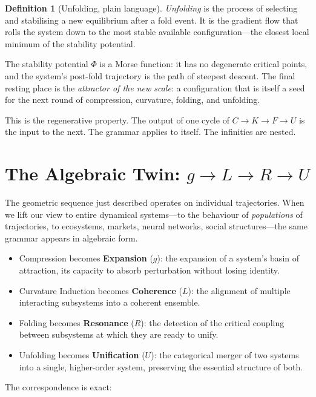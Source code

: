 \documentclass[12pt, oneside]{book}
\theoremstyle{plain}
\theoremstyle{definition}
\newtheorem{definition}{Definition}[chapter]
\theoremstyle{remark}
\begin{document}
\begin{definition}[Unfolding, plain language]
\emph{Unfolding} is the process of selecting and stabilising
a new equilibrium after a fold event. It is the gradient
flow that rolls the system down to the most stable available
configuration---the closest local minimum of the stability
potential.
\end{definition}

The stability potential $\Phi$ is a Morse function: it has
no degenerate critical points, and the system's post-fold
trajectory is the path of steepest descent. The final
resting place is the \emph{attractor of the new scale}:
a configuration that is itself a seed for the next round
of compression, curvature, folding, and unfolding.

This is the regenerative property. The output of one cycle
of $C \to K \to F \to U$ is the input to the next. The
grammar applies to itself. The infinities are nested.

\section{The Algebraic Twin: $g \to L \to R \to U$}

The geometric sequence just described operates on individual
trajectories. When we lift our view to entire dynamical
systems---to the behaviour of \emph{populations} of
trajectories, to ecosystems, markets, neural networks,
social structures---the same grammar appears in algebraic form.

\begin{itemize}
  \item Compression becomes \textbf{Expansion} ($g$): the
    expansion of a system's basin of attraction, its
    capacity to absorb perturbation without losing identity.
  \item Curvature Induction becomes \textbf{Coherence} ($L$):
    the alignment of multiple interacting subsystems into
    a coherent ensemble.
  \item Folding becomes \textbf{Resonance} ($R$): the detection
    of the critical coupling between subsystems at which
    they are ready to unify.
  \item Unfolding becomes \textbf{Unification} ($U$): the
    categorical merger of two systems into a single,
    higher-order system, preserving the essential structure
    of both.
\end{itemize}

The correspondence is exact:
\end{document}
